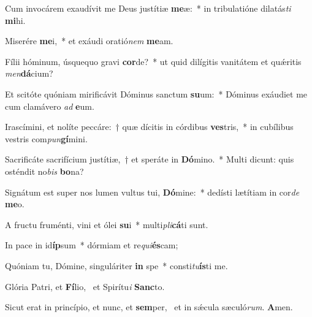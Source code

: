 \item Cum invocárem exaudívit me Deus justítiæ \textbf{me}æ:~* in tribulatióne dilatás\textit{ti} \textbf{mi}hi.
\item Miserére \textbf{me}i,~* et exáudi oratió\textit{nem} \textbf{me}am.
\item Fílii hóminum, úsquequo gravi \textbf{cor}de?~* ut quid dilígitis vanitátem et quǽritis \textit{men}\textbf{dá}cium?
\item Et scitóte quóniam mirificávit Dóminus sanctum \textbf{su}um:~* Dóminus exáudiet me cum clamávero \textit{ad} \textbf{e}um.
\item Irascímini, et nolíte peccáre:~† quæ dícitis in córdibus \textbf{ves}tris,~* in cubílibus vestris com\textit{pun}\textbf{gí}mini.
\item Sacrificáte sacrifícium justítiæ,~† et speráte in \textbf{Dó}mino.~* Multi dicunt: quis osténdit no\textit{bis} \textbf{bo}na?
\item Signátum est super nos lumen vultus tui, \textbf{Dó}mine:~* dedísti lætítiam in cor\textit{de} \textbf{me}o.
\item A fructu fruménti, vini et ólei \textbf{su}i~* multi\textit{pli}\textbf{cá}ti sunt.
\item In pace in id\textbf{íp}sum~* dórmiam et re\textit{qui}\textbf{és}cam;
\item Quóniam tu, Dómine, singuláriter \textbf{in} spe~* consti\textit{tu}\textbf{ís}ti me.
\item Glória Patri, et \textbf{Fí}lio,~\psstar{} et Spirítu\textit{i} \textbf{Sanc}to.
\item Sicut erat in princípio, et nunc, et \textbf{sem}per,~\psstar{} et in sǽcula sæculó\textit{rum}. \textbf{A}men.